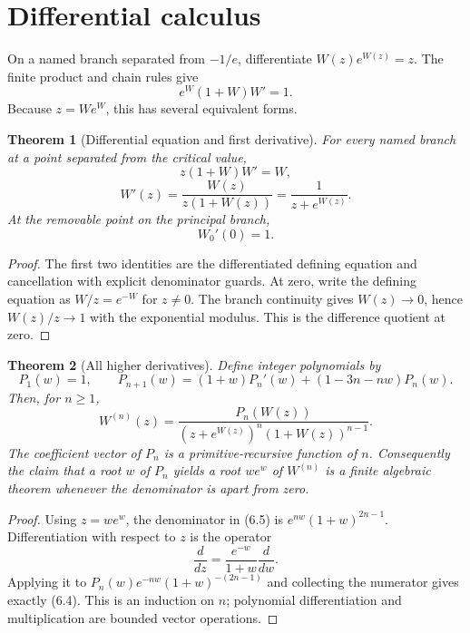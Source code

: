\documentclass[11pt]{article}
\newtheorem{theorem}{Theorem}[section]
\theoremstyle{definition}
\newcommand{\Wz}{W_0}
\begin{document}
\section{Differential calculus}\label{sec:calculus}

On a named branch separated from \(-1/e\), differentiate
\(W(z)e^{W(z)}=z\).  The finite product and chain rules give
\[
 e^W(1+W)W'=1.
 \]
Because \(z=We^W\), this has several equivalent forms.

\begin{theorem}[Differential equation and first derivative]\label{thm:derivative}
For every named branch at a point separated from the critical value,
\[
 z(1+W)W'=W,
 \tag{6.1}
\]
\[
 W'(z)=\frac{W(z)}{z(1+W(z))}
       =\frac1{z+e^{W(z)}}.
 \tag{6.2}
\]
At the removable point on the principal branch,
\[
 \Wz'(0)=1.
 \tag{6.3}
\]
\end{theorem}

\begin{proof}
The first two identities are the differentiated defining equation and
cancellation with explicit denominator guards.  At zero, write the defining
equation as \(W/z=e^{-W}\) for \(z\ne0\).  The branch continuity gives
\(W(z)\to0\), hence \(W(z)/z\to1\) with the exponential modulus.  This is the
difference quotient at zero.
\end{proof}

\begin{theorem}[All higher derivatives]\label{thm:higher-derivatives}
Define integer polynomials by
\[
 P_1(w)=1,
 \qquad
 P_{n+1}(w)=(1+w)P_n'(w)+(1-3n-nw)P_n(w).
 \tag{6.4}
\]
Then, for \(n\ge1\),
\[
 W^{(n)}(z)=
 \frac{P_n(W(z))}
 {(z+e^{W(z)})^n(1+W(z))^{n-1}}.
 \tag{6.5}
\]
The coefficient vector of \(P_n\) is a primitive-recursive function of \(n\).
Consequently the claim that a root \(w\) of \(P_n\) yields a root
\(we^w\) of \(W^{(n)}\) is a finite algebraic theorem whenever the denominator
is apart from zero.
\end{theorem}

\begin{proof}
Using \(z=we^w\), the denominator in (6.5) is
\(e^{nw}(1+w)^{2n-1}\).  Differentiation with respect to \(z\) is the operator
\[
 \frac{d}{dz}=\frac{e^{-w}}{1+w}\frac{d}{dw}.
\]
Applying it to
\(P_n(w)e^{-nw}(1+w)^{-(2n-1)}\) and collecting the numerator gives exactly
(6.4).  This is an induction on \(n\); polynomial differentiation and
multiplication are bounded vector operations.
\end{proof}
\end{document}
